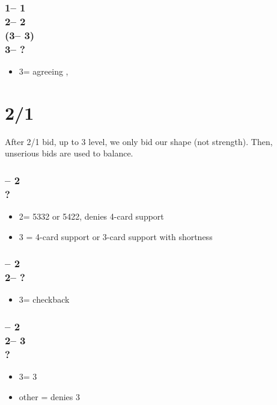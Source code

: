 \subsubsection*{1\hearts -- 1\spades\\
                2\hearts -- 2\nt\\
                (3\clubs -- 3\diams)\\
                3\hearts -- ?}
\begin{itemize}
    \item 3\spades = agreeing \hearts, \lsf
\end{itemize}

\section{\texorpdfstring{2/1 \gf}{2over1}}\label{sec:2over1}

After 2/1 bid, up to 3 level, we only bid our shape (not strength).
Then, unserious bids are used to balance.

\subsubsection*{ -- 2 \\ ?}
\begin{itemize}
    \item 2\nt = 5332 or 5422, denies 4-card support
    \item 3 = 4-card support or 3-card support with shortness
\end{itemize}

\subsubsection*{ -- 2 
                \\ 2\nt -- ?}
\begin{itemize}
    \item 3\clubs = checkback
\end{itemize}

\subsubsection*{ -- 2 
                \\ 2\nt -- 3\clubs \\ ?}
\begin{itemize}
    \item 3\diams = 3 \imp
    \item other = denies 3
\end{itemize}

